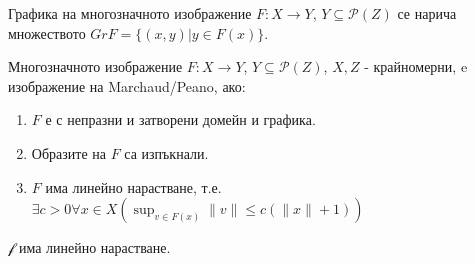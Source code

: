 
\begin{definition} \cite[стр~6]{Aubin1991}
  Графика на многозначното изображение $F:X \rightarrow Y$, $Y \subseteq \mathscr{P}(Z)$ се нарича множеството $Gr F = \{(x, y) \vert y \in F(x)\}$.
\end{definition}

\begin{definition} \cite[дефиниция~2.2.4, следствие~2.2.5]{Aubin1991}
  \label{def:Marchaud-Peano}
  Многозначното изображение $F:X \rightarrow Y$, $Y \subseteq \mathscr{P}(Z)$, $X, Z$ - крайномерни, e изображение на Marchaud/Peano, ако:
  \begin{enumerate}
    \item $F$ е с непразни и затворени домейн и графика.
    \item Образите на $F$ са изпъкнали.
    \item $F$ има линейно нарастване, т.е. $\exists{c>0}\forall{x \in X}(\sup_{v \in F(x)} \|v\| \leq c(\|x\|+1))$
  \end{enumerate}
\end{definition}

\begin{lemma}
  \label{lm:LinearGrowth}
  $\mathscr{f}$ има линейно нарастване.
\end{lemma}

